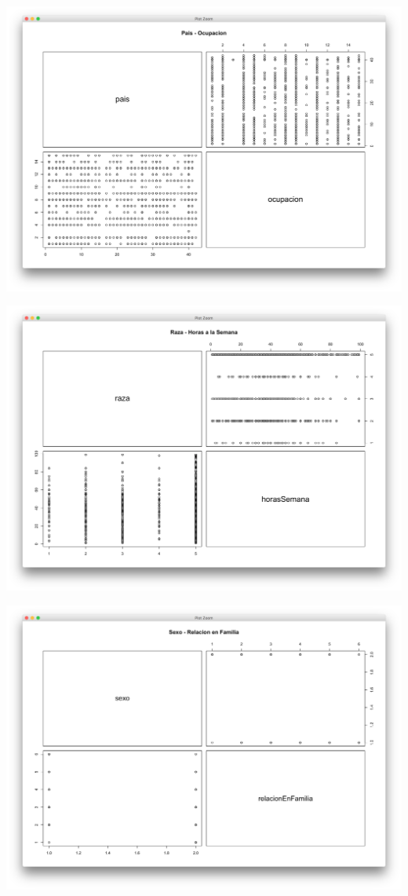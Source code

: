 \documentclass{article}
\begin{document}
  \begin{center}
    \hbox{\hspace{-5.5em}\includegraphics[scale=0.45]{graficas/pais-ocupacion}}
  \end{center}
  \begin{center}
    \hbox{\hspace{-5.5em}\includegraphics[scale=0.45]{graficas/raza-horas}}
  \end{center}
  \begin{center}
    \hbox{\hspace{-5.5em}\includegraphics[scale=0.45]{graficas/Sexo-RelFam}}
  \end{center}
\end{document}
